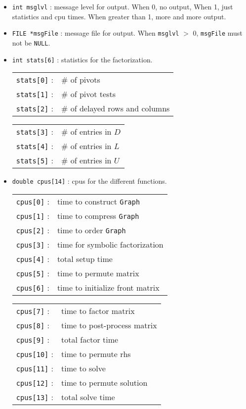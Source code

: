 \begin{itemize}
\begin{itemize}
\item
{\tt int msglvl} : message level for output.
When 0, no output, When 1, just statistics and cpu times.
When greater than 1, more and more output.
\item
{\tt FILE *msgFile} : message file for output.
When \texttt{msglvl} $>$ 0, \texttt{msgFile} must not be \texttt{NULL}.
\item
{\tt int stats[6]} : statistics for the factorization.
\begin{center}
\begin{tabular}{ll}
\texttt{stats[0]} : & \# of pivots \\
\texttt{stats[1]} : & \# of pivot tests \\
\texttt{stats[2]} : & \# of delayed rows and columns
\end{tabular}
\begin{tabular}{ll}
\texttt{stats[3]} : & \# of entries in $D$ \\
\texttt{stats[4]} : & \# of entries in $L$ \\
\texttt{stats[5]} : & \# of entries in $U$
\end{tabular}
\end{center}
\item
{\tt double cpus[14]} : cpus for the different functions.
\begin{center}
\begin{tabular}{ll}
\texttt{cpus[0]} : & time to construct \texttt{Graph} \\
\texttt{cpus[1]} : & time to compress \texttt{Graph} \\
\texttt{cpus[2]} : & time to order \texttt{Graph} \\
\texttt{cpus[3]} : & time for symbolic factorization \\
\texttt{cpus[4]} : & total setup time \\
\texttt{cpus[5]} : & time to permute matrix \\
\texttt{cpus[6]} : & time to initialize front matrix 
\end{tabular}
\begin{tabular}{ll}
\texttt{cpus[7]} : & time to factor matrix \\
\texttt{cpus[8]} : & time to post-process matrix \\
\texttt{cpus[9]} : & total factor time \\
\texttt{cpus[10]} : & time to permute rhs \\
\texttt{cpus[11]} : & time to solve \\
\texttt{cpus[12]} : & time to permute solution \\
\texttt{cpus[13]} : & total solve time
\end{tabular}
\end{center}
\end{itemize}
\end{itemize}
\par
